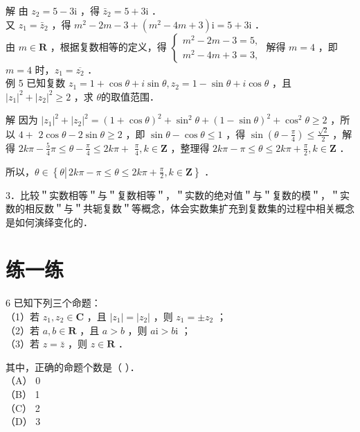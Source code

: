 \documentclass[10pt]{article}
\begin{document}
解 由 \(z_{2}=5-3 \mathrm{i}\) ，得 \(\bar{z}_{2}=5+3 \mathrm{i}\) ．\\
又 \(z_{1}=\bar{z}_{2}\) ，得 \(m^{2}-2 m-3+\left(m^{2}-4 m+3\right) \mathrm{i}=5+3 \mathrm{i}\) ．\\
由 \(m \in \mathbf{R}\) ，根据复数相等的定义，得 \(\left\{\begin{array}{l}m^{2}-2 m-3=5, \\ m^{2}-4 m+3=3,\end{array}\right.\) 解得 \(m=4\) ，即 \(m=4\) 时，\(z_{1}=\overline{z_{2}}\) ．\\
例 5 已知复数 \(z_{1}=1+\cos \theta+i \sin \theta, z_{2}=1-\sin \theta+i \cos \theta\) ，且 \(\left|z_{1}\right|^{2}+\left|z_{2}\right|^{2} \geqslant 2\) ，求 \(\theta\)的取值范围．

解 因为 \(\left|z_{1}\right|^{2}+\left|z_{2}\right|^{2}=(1+\cos \theta)^{2}+\sin ^{2} \theta+(1-\sin \theta)^{2}+\cos ^{2} \theta \geqslant 2\) ，所以 \(4+\) \(2 \cos \theta-2 \sin \theta \geqslant 2\) ，即 \(\sin \theta-\cos \theta \leqslant 1\) ，得 \(\sin \left(\theta-\frac{\pi}{4}\right) \leqslant \frac{\sqrt{2}}{2}\) ，解得 \(2 k \pi-\frac{5}{4} \pi \leqslant \theta-\frac{\pi}{4} \leqslant 2 k \pi+\) \(\frac{\pi}{4}, k \in \mathbf{Z}\) ，整理得 \(2 k \pi-\pi \leqslant \theta \leqslant 2 k \pi+\frac{\pi}{2}, k \in \mathbf{Z}\) ．

所以，\(\theta \in\left\{\theta \left\lvert\, 2 k \pi-\pi \leqslant \theta \leqslant 2 k \pi+\frac{\pi}{2}\right., k \in \mathbf{Z}\right\}\) ．

3．比较＂实数相等＂与＂复数相等＂，＂实数的绝对值＂与＂复数的模＂，＂实数的相反数＂与＂共轭复数＂等概念，体会实数集扩充到复数集的过程中相关概念是如何演绎变化的．

\section*{练一练}
6 已知下列三个命题：\\
（1）若 \(z_{1}, z_{2} \in \mathbf{C}\) ，且 \(\left|z_{1}\right|=\left|z_{2}\right|\) ，则 \(z_{1}= \pm z_{2}\) ；\\
（2）若 \(a, b \in \mathbf{R}\) ，且 \(a>b\) ，则 \(a \mathrm{i}>b \mathrm{i}\) ；\\
（3）若 \(z=\bar{z}\) ，则 \(z \in \mathbf{R}\) ．

其中，正确的命题个数是（ ）．\\
（A） 0\\
（B） 1\\
（C） 2\\
（D） 3
\end{document}
